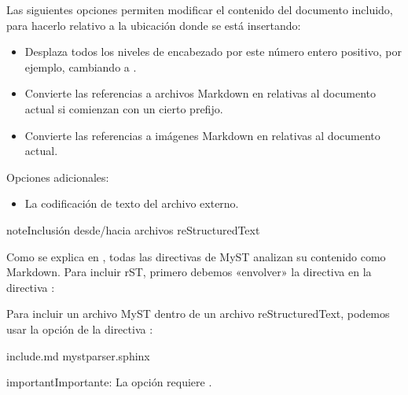 \documentclass[a4paper,10pt,oneside,spanish,openany]{sphinxmanual}
\begin{document}
\sphinxAtStartPar
Las siguientes opciones permiten modificar el contenido del documento incluido, para hacerlo relativo a la ubicación donde se está insertando:
\begin{itemize}
\item {} 
\sphinxAtStartPar
{} Desplaza todos los niveles de encabezado por este número entero positivo, por ejemplo, cambiando \sphinxcode{\sphinxupquote{\#}} a \sphinxcode{\sphinxupquote{\#\#\#\#}}.

\item {} 
\sphinxAtStartPar
{} Convierte las referencias a archivos Markdown en relativas al documento actual si comienzan con un cierto prefijo.

\item {} 
\sphinxAtStartPar
{} Convierte las referencias a imágenes Markdown en relativas al documento actual.

\end{itemize}

\sphinxAtStartPar
Opciones adicionales:
\begin{itemize}
\item {} 
\sphinxAtStartPar
{} La codificación de texto del archivo externo.

\end{itemize}

\begin{sphinxadmonition}{note}{Inclusión desde/hacia archivos reStructuredText}

\sphinxAtStartPar
Como se explica en {\hyperref[\detokenize{configuracion_inicial/013.guia_de_myst_parser:syntax/directives/parsing}]{}}, todas las directivas de MyST analizan su contenido como Markdown.
Para incluir rST, primero debemos «envolver» la directiva en la directiva {\hyperref[\detokenize{configuracion_inicial/013.guia_de_myst_parser:syntax/directives/parsing}]{}}:

\sphinxAtStartPar
Para incluir un archivo MyST dentro de un archivo reStructuredText, podemos usar la opción  de la directiva :

\begin{sphinxVerbatim}[commandchars=\\\{\}]
  include.md
    myst\PYGZus{}parser.sphinx\PYGZus{}
\end{sphinxVerbatim}

\begin{sphinxadmonition}{important}{Importante:}
\sphinxAtStartPar
La opción  requiere .
\end{sphinxadmonition}
\end{sphinxadmonition}
\end{document}
